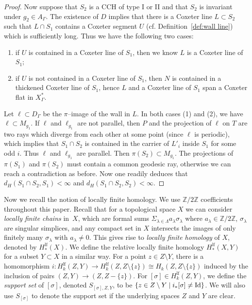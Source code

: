 \documentclass[11pt]{amsart}
\theoremstyle{definition}
\newcommand{\Xa}{X^{\ast}}
\begin{document}
\begin{proof}
Now suppose that $S_2$ is a CCH of type I or II and that $S_2$ is invariant under $g_2\in A_\Gamma$. The existence of $D$ implies that there is a Coxeter line $L\subset S_2$ such that $L\cap S_1$ contains a Coxeter segment $U$ (cf. Definition~\ref{def:wall line}) which is sufficiently long. Thus we have the following two cases:
\begin{enumerate}
	\item if $U$ is contained in a Coxeter line of $S_1$, then we know $L$ is a Coxeter line of $S_1$;
	\item if $U$ is not contained in a Coxeter line of $S_1$, then $N$ is contained in a thickened Coxeter line of $S_1$, hence $L$ and a Coxeter line of $S_1$ span a Coxeter flat in $\Xa_\Gamma$.
\end{enumerate}
Let $\ell\subset D_\Gamma$ be the $\pi$--image of the wall in $L$. In both cases (1) and (2), we have $\ell\subset M_{g_1}$. If $\ell$ and $\ell_{g_1}$ are not parallel, then $P$ and the projection of $\ell$ on $T$ are two rays which diverge from each other at some point (since $\ell$ is periodic), which implies that $S_1\cap S_2$ is contained in the carrier of $L'_i$ inside $S_1$ for some odd $i$. Thus $\ell$ and $\ell_{g_1}$ are parallel. Then $\pi(S_2)\subset M_{g_1}$. The projections of $\pi(S_1)$ and $\pi(S_2)$ must contain a common geodesic ray, otherwise we can reach a contradiction as before. Now one readily deduces that $d_H(S_1\cap S_2,S_1)<\infty$ and $d_H(S_1\cap S_2,S_2)<\infty$.
\end{proof}

Now we recall the notion of locally finite homology. We use $\mathbb Z/2\mathbb Z$ coefficients throughout this paper. Recall that for a topological space $X$ we can consider \emph{locally finite chains} in~$X$, which are formal sums $\Sigma_{\lambda\in\Lambda}a_{\lambda}\sigma_{\lambda}$ where $a_{\lambda}\in\mathbb Z/2\mathbb Z$, $\sigma_{\lambda}$ are singular simplices, and any compact set in $X$ intersects the images of only finitely many $\sigma_{\lambda}$ with $a_{\lambda}\neq 0$. This
gives rise to \textit{locally finite homology} of $X$, denoted by $H^{\mathrm{lf}}_{*}(X)$. We define the relative locally finite homology $H^{\mathrm{lf}}_{*}(X,Y)$ for a subset $Y\subset X$ in a similar way. For a point $z\in Z\setminus Y$, there is a homomorphism $i\colon H^{\mathrm{lf}}_{k}(Z,Y)\to H^{\mathrm{lf}}_{k}(Z,Z\setminus\{z\})\cong H_{k}(Z,Z\setminus\{z\})$ induced by the inclusion of pairs $(Z,Y)\to (Z,Z-\{z\})$. For $[\sigma]\in H^{\mathrm{lf}}_{k}(Z,Y)$, we define the \emph{support set} of $[\sigma]$, denoted $S_{[\sigma],Z,Y}$, to be $\{z\in Z\setminus Y\mid i_{\ast}[\sigma]\neq \textmd{Id}\}$. We will also use $S_{[\sigma]}$ to denote the support set if the underlying spaces $Z$ and $Y$ are clear. 
\end{document}
